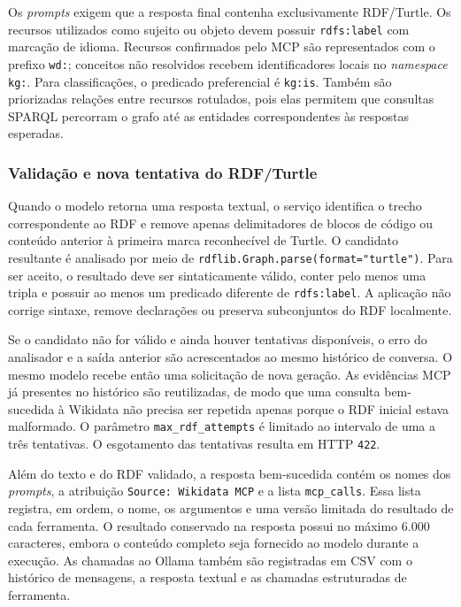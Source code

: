 Os \textit{prompts} exigem que a resposta final contenha exclusivamente
RDF/Turtle. Os recursos utilizados como sujeito ou objeto devem possuir
\texttt{rdfs:label} com marcação de idioma. Recursos confirmados pelo MCP são
representados com o prefixo \texttt{wd:}; conceitos não resolvidos recebem
identificadores locais no \textit{namespace} \texttt{kg:}. Para classificações,
o predicado preferencial é \texttt{kg:is}. Também são priorizadas relações
entre recursos rotulados, pois elas permitem que consultas SPARQL percorram o
grafo até as entidades correspondentes às respostas esperadas.

\subsubsection{Validação e nova tentativa do RDF/Turtle}

Quando o modelo retorna uma resposta textual, o serviço identifica o trecho
correspondente ao RDF e remove apenas delimitadores de blocos de código ou
conteúdo anterior à primeira marca reconhecível de Turtle. O candidato
resultante é analisado por meio de
\texttt{rdflib.Graph.parse(format="turtle")}. Para ser aceito, o resultado deve
ser sintaticamente válido, conter pelo menos uma tripla e possuir ao menos um
predicado diferente de \texttt{rdfs:label}. A aplicação não corrige sintaxe,
remove declarações ou preserva subconjuntos do RDF localmente.

Se o candidato não for válido e ainda houver tentativas disponíveis, o erro
do analisador e a saída anterior são acrescentados ao mesmo histórico de
conversa. O mesmo modelo recebe então uma solicitação de nova geração. As evidências MCP
já presentes no histórico são reutilizadas, de modo que uma consulta bem-sucedida
à Wikidata não precisa ser repetida apenas porque o RDF inicial estava
malformado. O parâmetro \texttt{max\_rdf\_attempts} é limitado ao intervalo de
uma a três tentativas. O esgotamento das tentativas resulta em HTTP
\texttt{422}.

Além do texto e do RDF validado, a resposta bem-sucedida contém os nomes dos
\textit{prompts}, a atribuição \texttt{Source: Wikidata MCP} e a lista
\texttt{mcp\_calls}. Essa lista registra, em ordem, o nome, os argumentos e uma
versão limitada do resultado de cada ferramenta. O resultado conservado na
resposta possui no máximo 6.000 caracteres, embora o conteúdo completo seja
fornecido ao modelo durante a execução. As chamadas ao Ollama também são
registradas em CSV com o histórico de mensagens, a resposta textual e as
chamadas estruturadas de ferramenta.

